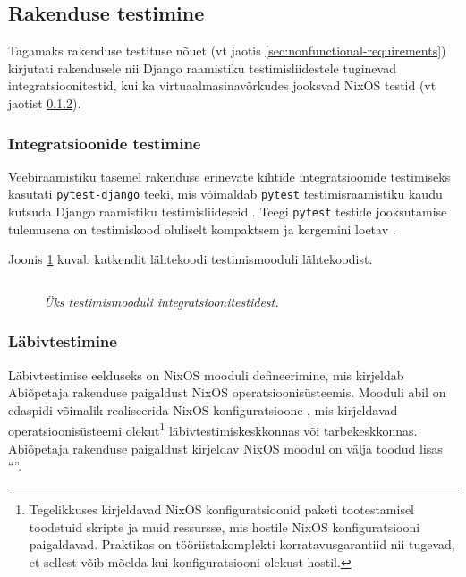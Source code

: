 \subsection{Rakenduse testimine}

Tagamaks rakenduse testituse nõuet (vt jaotis \ref{sec:nonfunctional-requirements}) kirjutati rakendusele nii Django raamistiku testimisliidestele \cite{django-testing-api} tuginevad integratsioonitestid, kui ka virtuaalmasinavõrkudes jooksvad NixOS testid \cite{nixos-tests} (vt jaotist \ref{subsubsec:e2etests}).

\subsubsection{Integratsioonide testimine}

Veebiraamistiku tasemel rakenduse erinevate kihtide integratsioonide testimiseks kasutati \texttt{pytest-django} teeki, mis võimaldab
\texttt{pytest} testimisraamistiku kaudu kutsuda Django raamistiku testimisliideseid \cite{pytest-django-usage}. Teegi \texttt{pytest} testide jooksutamise tulemusena on testimiskood oluliselt kompaktsem ja kergemini loetav \cite{pytest-django-why}.

Joonis \ref{fig:pytest} kuvab katkendit lähtekoodi testimismooduli lähtekoodist.

\begin{figure}
\inputminted[breaklines]{py}{chapters/data/test.py}
\caption{\emph{Üks testimismooduli integratsioonitestidest.}}\label{fig:pytest}
\end{figure}

\subsubsection{Läbivtestimine}\label{subsubsec:e2etests}

\newcommand{\stateActually}{Tegelikkuses kirjeldavad NixOS konfiguratsioonid paketi tootestamisel toodetuid skripte ja muid ressursse, mis hostile NixOS konfiguratsiooni paigaldavad. Praktikas on tööriistakomplekti korratavusgarantiid nii tugevad, et sellest võib mõelda kui konfiguratsiooni olekust hostil.}

Läbivtestimise eelduseks on NixOS mooduli defineerimine, mis kirjeldab Abiõpetaja rakenduse paigaldust NixOS operatsioonisüsteemis. Mooduli abil on edaspidi võimalik realiseerida NixOS konfiguratsioone \cite{nixos-configuration}, mis kirjeldavad operatsioonisüsteemi olekut\footnote{\stateActually} läbivtestimiskeskkonnas või tarbekeskkonnas. Abiõpetaja rakenduse paigaldust kirjeldav NixOS moodul on välja toodud lisas ``''.

